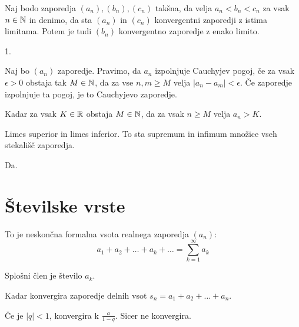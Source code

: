 Naj bodo zaporedja $(a_n), (b_n), (c_n)$ takšna, da velja $a_n < b_n < c_n$ za vsak $n \in \mathbb{N}$ in denimo, da sta $(a_n)$ in $(c_n)$ konvergentni zaporedji z istima limitama. Potem je tudi $(b_n)$ konvergentno zaporedje z enako limito.


1.


Naj bo $(a_n)$ zaporedje. Pravimo, da $a_n$ izpolnjuje Cauchyjev pogoj, če za vsak $\epsilon>0$ obstaja tak $M\in\mathbb{N}$, da za vse $n,m\ge M$ velja $|a_n-a_m| < \epsilon$. Če zaporedje izpolnjuje ta pogoj, je to Cauchyjevo zaporedje.


Kadar za vsak $K \in \mathbb{R}$ obstaja $M \in \mathbb{N}$, da za vsak $n\ge M$ velja $a_n > K$.


Limes superior in limes inferior. To sta supremum in infimum množice vseh stekališč zaporedja.


Da.

\section{Številske vrste}


To je neskončna formalna vsota realnega zaporedja $(a_n)$: \[
	a_1 + a_2 + \ldots + a_k + \ldots = \sum_{k=1}^{\infty} a_k
\]

Splošni člen je število $a_k$.


Kadar konvergira zaporedje delnih vsot $s_n = a_1 + a_2 + \ldots + a_n$.


Če je $|q| < 1$, konvergira k $\frac{a}{1-q}$. Sicer ne konvergira.


